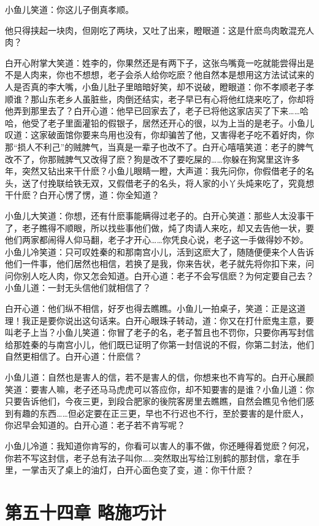 \documentclass[12pt,oneside]{book}
\begin{document}
小鱼儿笑道：你这儿子倒真孝顺。

他只得挟起一块肉，但刚吃了两块，又吐了出来，瞪眼道：这是什麽鸟肉敢混充人肉？

白开心附掌大笑道：姓李的，你果然还是有两下子，这张鸟嘴竟一吃就能尝得出是不是人肉来，你也不想想，老子会杀人给你吃麽？他自然本是想用这方法试试来的人是否真的李大嘴，小鱼儿肚子里暗暗好笑，却不说破，瞪眼道：你不孝顺老子孝顺谁？那山东老乡人虽脏些，肉倒还结实，老子早已有心将他红烧来吃了，你却将他弄到那里去了？白开心道：他早已回家去了，老子已将他这家店买了下来\ldots\ldots 哈哈，他受了老子里面灌铅的假银子，居然还开心的很，以为上当的是老子。小鱼儿叹道：这家破面馆你要来鸟用也没有，你却骗苦了他，又害得老子吃不着好肉，你那``损人不利己''的贼脾气，当真是一辈子也改不了。白开心嘻嘻笑道：老子的脾气改不了，你那贼脾气又改得了麽？狗是改不了要吃屎的\ldots\ldots 你躲在狗窝里这许多年，突然又钻出来干什麽？小鱼儿眼睛一瞪，大声道：我先问你，你假借老子的名头，送了付挽联给铁无双，又假借老子的名头，将人家的小丫头炖来吃了，究竟想干什麽？白开心愣了愣，道：你全知道？

小鱼儿大笑道：你想，还有什麽事能瞒得过老子的。白开心笑道：那些人太没事干了，老子瞧得不顺眼，所以找些事他们做，炖了肉请人来吃，却又去告他一状，要他们两家都闹得人仰马翻，老子才开心\ldots\ldots 你凭良心说，老子这一手做得妙不妙。小鱼儿冷笑道：只可叹姓秦的和那南宫小儿，活到这麽大了，随随便便来个人告诉他们一件事，他们居然也相信，若换了是我，你来告状，老子就先将你扣下来，问问你别人吃人肉，你又怎会知道。白开心道：老子不会写信麽？为何定要自己去？小鱼儿道：一封无头信他们就相信了？

白开心道：他们纵不相信，好歹也得去瞧瞧。小鱼儿一拍桌子，笑道：正是这道理！我正是要你说出这句话来。白开心眼珠子转动，道：你又在打什麽鬼主意，要叫老子上当？小鱼儿笑道：你冒了老子的名，老子暂且也不罚你，只要你再写封信给那姓秦的与南宫小儿，他们既已证明了你第一封信说的不假，你第二封法，他们自然更相信了。白开心道：什麽信？

小鱼儿道：自然也是害人的信，若不是害人的信，你想来也不肯写的。白开心展颜笑道：要害人嘛，老子还马马虎虎可以答应你，却不知要害的是谁？小鱼儿道：你只要告诉他们，今夜三更，到段合肥家的後院客房里去瞧瞧，自然会瞧见令他们感到有趣的东西\ldots\ldots 但必定要在正三更，早也不行迟也不行，至於要害的是什麽人，你迟早会知道的。白开心道：老子若不肯写呢？

小鱼儿冷道：我知道你肯写的，你看可以害人的事不做，你还睡得着觉麽？何况，你若不写这封信，老子总有法子叫你\ldots\ldots 突然取出写给江别鹤的那封信，拿在手里，一掌击灭了桌上的油灯，白开心面色变了变，道：你干什麽？

\hypertarget{ux7b2cux4e94ux5341ux56dbux7ae0-ux7565ux65bdux5de7ux8ba1}{%
\chapter{第五十四章
略施巧计}\label{ux7b2cux4e94ux5341ux56dbux7ae0-ux7565ux65bdux5de7ux8ba1}}
\end{document}
